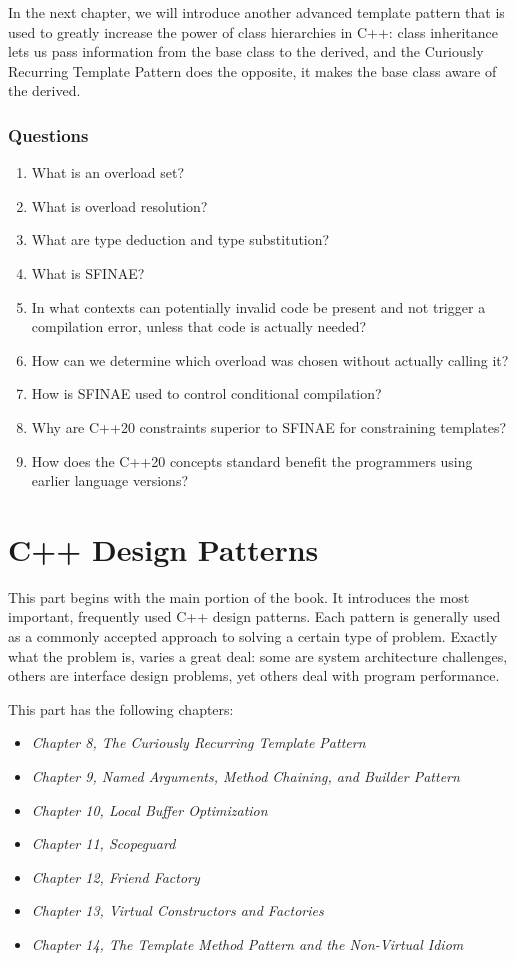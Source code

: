 In the next chapter, we will introduce another advanced template pattern that is used to greatly increase the power of class hierarchies in C++: class inheritance lets us pass information from the base class to the derived, and the Curiously Recurring Template Pattern does the opposite, it makes the base class aware of the derived.

\section{Questions}

\begin{enumerate}
\item
  What is an overload set?
\item
  What is overload resolution?
\item
  What are type deduction and type substitution?
\item
  What is SFINAE?
\item
  In what contexts can potentially invalid code be present and not trigger a compilation error, unless that code is actually needed?
\item
  How can we determine which overload was chosen without actually calling it?
\item
  How is SFINAE used to control conditional compilation?
\item
  Why are C++20 constraints superior to SFINAE for constraining templates?
\item
  How does the C++20 concepts standard benefit the programmers using earlier language versions?
\end{enumerate}


\part{C++ Design Patterns}

This part begins with the main portion of the book. It introduces the most important, frequently used C++ design patterns. Each pattern is generally used as a commonly accepted approach to solving a certain type of problem. Exactly what the problem is, varies a great deal: some are system architecture challenges, others are interface design problems, yet others deal with program performance.

This part has the following chapters:

\begin{itemize}
\item
  \emph{Chapter 8, The Curiously Recurring Template Pattern}
\item
  \emph{Chapter 9, Named Arguments, Method Chaining, and Builder Pattern}
\item
  \emph{Chapter 10, Local Buffer Optimization}
\item
  \emph{Chapter 11, Scopeguard}
\item
  \emph{Chapter 12, Friend Factory}
\item
  \emph{Chapter 13, Virtual Constructors and Factories}
\item
  \emph{Chapter 14, The Template Method Pattern and the Non-Virtual Idiom}
\end{itemize}


